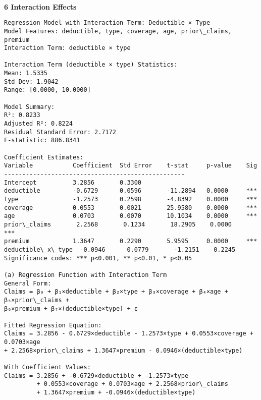 \documentclass[8pt, twocolumn]{extarticle}
\begin{document}
    \begin{center}
    \end{center}
    { \hspace*{\fill} \\}
    
    \begin{Verbatim}[commandchars=\\\{\}]
    \end{Verbatim}
    \textbf{6 Interaction Effects}
    \begin{Verbatim}[commandchars=\\\{\}]
Regression Model with Interaction Term: Deductible × Type
Model Features: deductible, type, coverage, age, prior\_claims, premium
Interaction Term: deductible × type

Interaction Term (deductible × type) Statistics:
Mean: 1.5335
Std Dev: 1.9042
Range: [0.0000, 10.0000]

Model Summary:
R²: 0.8233
Adjusted R²: 0.8224
Residual Standard Error: 2.7172
F-statistic: 886.8341

Coefficient Estimates:
Variable           Coefficient  Std Error    t-stat     p-value    Sig
--------------------------------------------------
Intercept          3.2856       0.3300
deductible         -0.6729      0.0596       -11.2894   0.0000     ***
type               -1.2573      0.2598       -4.8392    0.0000     ***
coverage           0.0553       0.0021       25.9580    0.0000     ***
age                0.0703       0.0070       10.1034    0.0000     ***
prior\_claims       2.2568       0.1234       18.2905    0.0000     ***
premium            1.3647       0.2290       5.9595     0.0000     ***
deductible\_x\_type  -0.0946      0.0779       -1.2151    0.2245
Significance codes: *** p<0.001, ** p<0.01, * p<0.05

(a) Regression Function with Interaction Term
General Form:
Claims = β₀ + β₁×deductible + β₂×type + β₃×coverage + β₄×age + β₅×prior\_claims +
β₆×premium + β₇×(deductible×type) + ε

Fitted Regression Equation:
Claims = 3.2856 - 0.6729×deductible - 1.2573×type + 0.0553×coverage + 0.0703×age
+ 2.2568×prior\_claims + 1.3647×premium - 0.0946×(deductible×type)

With Coefficient Values:
Claims = 3.2856 + -0.6729×deductible + -1.2573×type
         + 0.0553×coverage + 0.0703×age + 2.2568×prior\_claims
         + 1.3647×premium + -0.0946×(deductible×type)
    \end{Verbatim}
\end{document}
